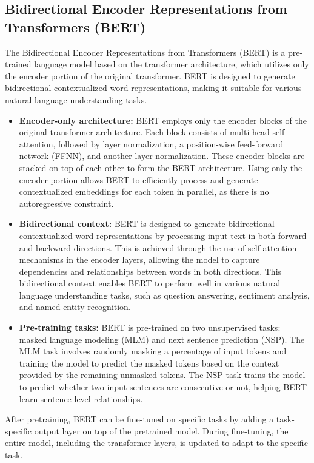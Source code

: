 \documentclass[12pt]{article}
\begin{document}
\subsection{Bidirectional Encoder Representations from Transformers (BERT)}
The Bidirectional Encoder Representations from Transformers (BERT) is a pre-trained language model based on the transformer architecture, which utilizes only the encoder portion of the original transformer. BERT is designed to generate bidirectional contextualized word representations, making it suitable for various natural language understanding tasks.
\begin{itemize}
    \item \textbf{Encoder-only architecture:} BERT employs only the encoder blocks of the original transformer architecture. Each block consists of multi-head self-attention, followed by layer normalization, a position-wise feed-forward network (FFNN), and another layer normalization. These encoder blocks are stacked on top of each other to form the BERT architecture. Using only the encoder portion allows BERT to efficiently process and generate contextualized embeddings for each token in parallel, as there is no autoregressive constraint.
    
    \item \textbf{Bidirectional context:} BERT is designed to generate bidirectional contextualized word representations by processing input text in both forward and backward directions. This is achieved through the use of self-attention mechanisms in the encoder layers, allowing the model to capture dependencies and relationships between words in both directions. This bidirectional context enables BERT to perform well in various natural language understanding tasks, such as question answering, sentiment analysis, and named entity recognition.

    \item \textbf{Pre-training tasks:} BERT is pre-trained on two unsupervised tasks: masked language modeling (MLM) and next sentence prediction (NSP). The MLM task involves randomly masking a percentage of input tokens and training the model to predict the masked tokens based on the context provided by the remaining unmasked tokens. The NSP task trains the model to predict whether two input sentences are consecutive or not, helping BERT learn sentence-level relationships.
\end{itemize}

After pretraining, BERT can be fine-tuned on specific tasks by adding a task-specific output layer on top of the pretrained model. During fine-tuning, the entire model, including the transformer layers, is updated to adapt to the specific task.
\end{document}
